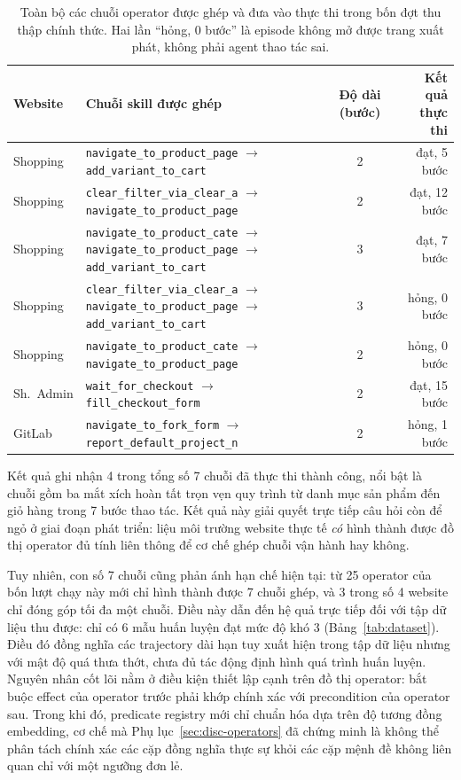 \begin{table}[H]
\centering
\caption[Bảy chuỗi operator đã thử]{Toàn bộ các chuỗi operator được ghép và
đưa vào thực thi trong bốn đợt thu thập chính thức. Hai lần ``hỏng, 0 bước''
là episode không mở được trang xuất phát, không phải agent thao tác sai.}
\label{tab:app-chains}
\small
\begin{tabular}{@{}lL{6.6cm}cr@{}}
\toprule
\textbf{Website} & \textbf{Chuỗi skill được ghép} & \textbf{Độ dài (bước)} &
\textbf{Kết quả thực thi} \\
\midrule
Shopping & \texttt{navigate\_to\_product\_page} $\rightarrow$
\texttt{add\_variant\_to\_cart} & 2 & đạt, 5 bước \\
Shopping & \texttt{clear\_filter\_via\_clear\_a} $\rightarrow$
\texttt{navigate\_to\_product\_page} & 2 & đạt, 12 bước \\
Shopping & \texttt{navigate\_to\_product\_cate} $\rightarrow$
\texttt{navigate\_to\_product\_page} $\rightarrow$
\texttt{add\_variant\_to\_cart} & 3 & đạt, 7 bước \\
Shopping & \texttt{clear\_filter\_via\_clear\_a} $\rightarrow$
\texttt{navigate\_to\_product\_page} $\rightarrow$
\texttt{add\_variant\_to\_cart} & 3 & hỏng, 0 bước \\
Shopping & \texttt{navigate\_to\_product\_cate} $\rightarrow$
\texttt{navigate\_to\_product\_page} & 2 & hỏng, 0 bước \\
Sh.\ Admin & \texttt{wait\_for\_checkout} $\rightarrow$
\texttt{fill\_checkout\_form} & 2 & đạt, 15 bước \\
GitLab & \texttt{navigate\_to\_fork\_form} $\rightarrow$
\texttt{report\_default\_project\_n} & 2 & hỏng, 1 bước \\
\bottomrule
\end{tabular}
\end{table}

\noindent
Kết quả ghi nhận 4 trong tổng số 7 chuỗi đã thực thi thành công, nổi bật
là chuỗi gồm ba mắt xích hoàn tất trọn vẹn quy trình từ danh mục sản phẩm đến
giỏ hàng trong 7 bước thao tác. Kết quả này giải quyết trực tiếp câu hỏi còn
để ngỏ ở giai đoạn phát triển: liệu môi trường website thực tế \emph{có} hình
thành được đồ thị operator đủ tính liên thông để cơ chế ghép chuỗi vận hành hay không.

Tuy nhiên, con số 7 chuỗi cũng phản ánh hạn chế hiện tại: từ 25 operator của bốn lượt chạy này mới
chỉ hình thành được 7 chuỗi ghép, và 3 trong số 4 website chỉ đóng góp tối đa một
chuỗi. Điều này dẫn đến hệ quả trực tiếp đối với tập dữ liệu thu được: chỉ có 6
mẫu huấn luyện đạt mức độ khó 3 (Bảng~\ref{tab:dataset}). Điều đó đồng nghĩa các
trajectory dài hạn tuy xuất hiện trong tập dữ liệu nhưng với mật độ quá thưa
thớt, chưa đủ tác động định hình quá trình huấn luyện. Nguyên nhân cốt lõi nằm
ở điều kiện thiết lập cạnh trên đồ thị operator: bắt buộc effect của operator
trước phải khớp chính xác với precondition của operator sau. Trong khi đó, predicate registry mới chỉ chuẩn hóa dựa trên độ tương đồng
embedding, cơ chế mà Phụ lục~\ref{sec:disc-operators} đã chứng minh là không thể
phân tách chính xác các cặp đồng nghĩa thực sự khỏi các cặp mệnh đề không liên
quan chỉ với một ngưỡng đơn lẻ.

